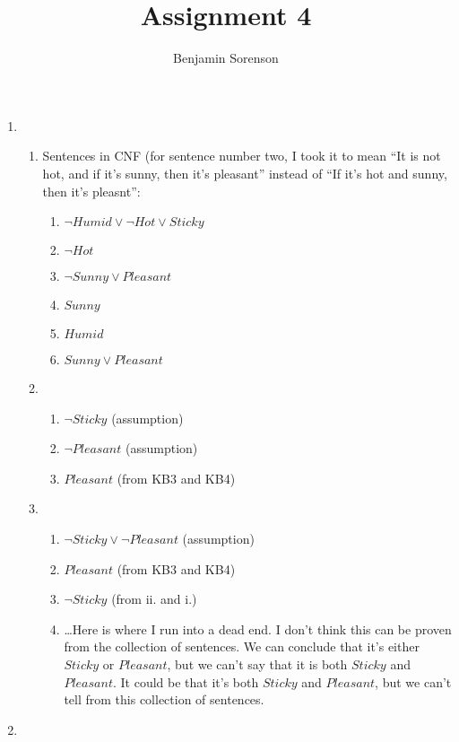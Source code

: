 \documentclass[11pt]{article}
\begin{document}
\author{Benjamin Sorenson} \title{Assignment 4}
\maketitle
\begin{enumerate}[label=\bfseries Question \arabic*:]
\item
  \begin{enumerate}
  \item Sentences in CNF (for sentence number two, I took it to mean
    ``It is not hot, and if it's sunny, then it's pleasant'' instead
    of ``If it's hot and sunny, then it's pleasnt'':
    \begin{enumerate}[label= KB\arabic*.]
    \item \(\lnot Humid \lor \lnot Hot \lor Sticky \)
    \item \(\lnot Hot\)
    \item \(\lnot Sunny \lor Pleasant\)
    \item \(Sunny\)
    \item \(Humid\)
    \item\(Sunny \lor Pleasant\)
    \end{enumerate}
  \item
    \begin{enumerate}
    \item \(\lnot Sticky\) (assumption)
    \item \(\lnot Pleasant\) (assumption)
    \item \(Pleasant \) (from KB3 and KB4)
    \end{enumerate}
  \item
    \begin{enumerate}
    \item \(\lnot Sticky \lor \lnot Pleasant\) (assumption)
    \item \(Pleasant \) (from KB3 and KB4)
    \item \(\lnot Sticky\) (from ii. and i.)
    \item \dots Here is where I run into a dead end. I don't think
      this can be proven from the collection of sentences. We can
      conclude that it's either \(Sticky\)
      or \(Pleasant\),
      but we can't say that it is both \(Sticky\)
      and \(Pleasant\).
      It could be that it's both \(Sticky\)
      and \(Pleasant\),
      but we can't tell from this collection of sentences.
    \end{enumerate}
  \end{enumerate}
\item

\end{enumerate}
\end{document}
